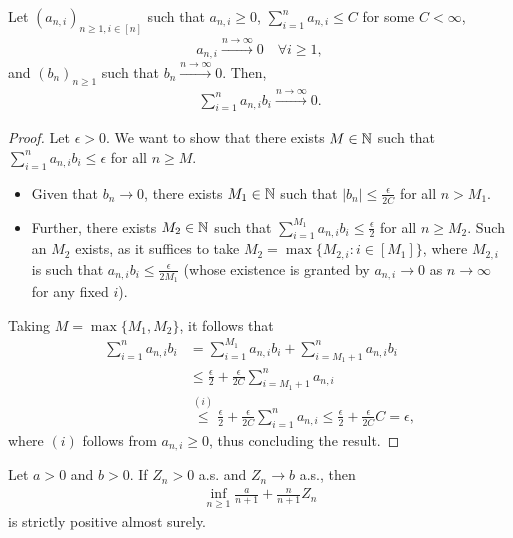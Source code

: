 \begin{lemma} \label{lemma:triangular_lemma}
    Let $(a_{n, i})_{n \geq 1, i \in [n]}$ such that $a_{n, i} \geq 0$,  $\sum_{i = 1}^n a_{n, i} \leq C$ for some $C < \infty$, 
    \begin{align*}
        a_{n, i} \stackrel{n \to \infty}{\to} 0 \quad \forall i \geq 1,
    \end{align*}
    and $(b_n)_{n \geq 1}$ such that $b_{n} \stackrel{n \to \infty}{\to} 0$. Then,
    \begin{align*}
        \sum_{i=1}^n a_{n, i} b_i \stackrel{n \to \infty}{\to} 0.
    \end{align*}
\end{lemma}
\begin{proof}
    Let $\epsilon > 0$. We want to show that there exists $M \in \mathbb{N}$ such that $\sum_{i = 1}^n a_{n, i} b_i \leq \epsilon$ for all $n \geq M$.
    \begin{itemize}
        \item Given that $b_n \to 0$, there exists $M_1 \in \mathbb{N}$ such that $|b_n| \leq \frac{\epsilon}{2C}$ for all $n > M_1$.
        \item Further, there exists $M_2 \in \mathbb{N}$ such that $\sum_{i=1}^{M_1} a_{n, i} b_i \leq \frac{\epsilon}{2}$ for all $n \geq M_2$. Such an $M_2$ exists, as it suffices to take $M_2 = \max \{ M_{2, i}: i \in [M_1]\}$, where $M_{2, i}$ is such that $a_{n, i}b_i \leq \frac{\epsilon}{2  M_1}$ (whose existence is granted by $a_{n, i} \to 0$ as $n \to \infty$ for any fixed $i$).
    \end{itemize}
    Taking $M = \max \{ M_1, M_2 \}$, it follows that 
    \begin{align*}
        \sum_{i=1}^n a_{n, i} b_i &= \sum_{i=1}^{M_1} a_{n, i} b_i + \sum_{i=M_1+1}^n a_{n, i} b_i
        \\&\leq \frac{\epsilon}{2} + \frac{\epsilon}{2C}\sum_{i=M_1+1}^n a_{n, i}
        \\&\stackrel{(i)}{\leq} \frac{\epsilon}{2} + \frac{\epsilon}{2C}\sum_{i=1}^n a_{n, i}
        \stackrel{}{\leq} \frac{\epsilon}{2} + \frac{\epsilon}{2C}C
        = \epsilon,
    \end{align*}
    where $(i)$ follows from $a_{n, i} \geq 0$, thus concluding the result.
\end{proof}


\begin{lemma} \label{lemma:sequence_lower_bounded_almost_surely}
    Let $a >0$ and $b >0$. If $Z_n > 0$ a.s. and $Z_n \to b$ a.s., then
    \begin{align*}
        \inf_{n \geq 1} \frac{a}{n + 1} + \frac{n}{n+1} Z_n
    \end{align*}
    is strictly positive almost surely.
\end{lemma}


